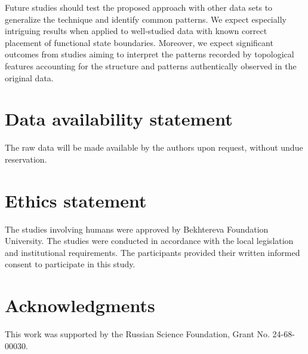 \documentclass[10pt,lettersize,journal]{IEEEtran}
\begin{document}
Future studies should test the proposed approach with other data sets to generalize the technique and identify common patterns. We expect especially intriguing results when applied to well-studied data with known correct placement of functional state boundaries. Moreover, we expect significant outcomes from studies aiming to interpret the patterns recorded by topological features accounting for the structure and patterns authentically observed in the original data.  

\section{Data availability statement}

The raw data will be made available by the authors upon request, without undue reservation.

\section{Ethics statement}

The studies involving humans were approved by Bekhtereva Foundation University. The studies were conducted in accordance with the local legislation and institutional requirements. The participants provided their written informed consent to participate in this study.

\section{Acknowledgments}
\noindent This work was supported by the Russian Science Foundation, Grant No. 24-68-00030.



\end{document}
